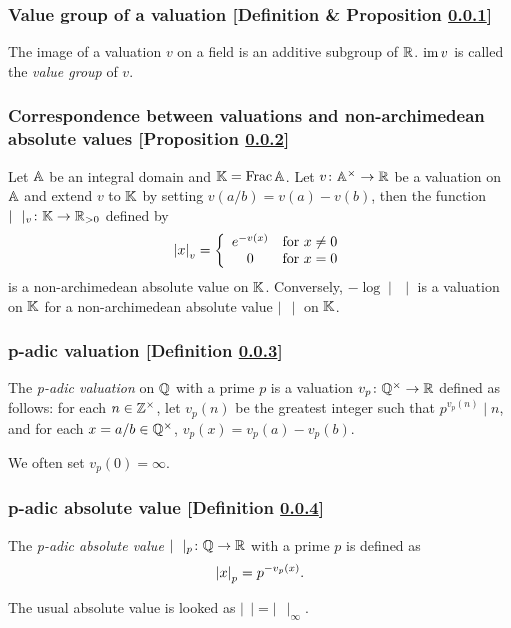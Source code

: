 \subsubsection{Value group of a valuation [Definition \& Proposition \ref{value-group-of-a-valuation}]}\label{value-group-of-a-valuation}
The image of a valuation $v$ on a field is an additive subgroup of $\mathbb{R}$. $\mathrm{im}\, v$ is called the \textit{value group} of $v$.

\subsubsection{Correspondence between valuations and non-archimedean absolute values [Proposition \ref{correspondence-between-valuations-and-non-archimedean-absolute-values}]}\label{correspondence-between-valuations-and-non-archimedean-absolute-values}
Let $\mathbb{A}$ be an integral domain and $\mathbb{K} = \mathrm{Frac} \,\mathbb{A}$. Let $v\colon \mathbb{A}^\times \to \mathbb{R}$ be a valuation on $\mathbb{A}$ and extend $v$ to $\mathbb{K}$ by setting $v(a/b) = v(a) - v(b)$, then the function $\mid\ \ \mid_v \colon \mathbb{K} \to \mathbb{R}_{>0}$ defined by
\[
\left| x \right|_v = \left\{ \begin{array}{cl}
 e^{-v(x)} & \text{for}\ x \neq 0 \\
 0 & \text{for}\ x = 0    
 \end{array} \right.
 \] is a non-archimedean absolute value on $\mathbb{K}$. Conversely, $-\log \mid \,\ \mid$ is a valuation on $\mathbb{K}$ for a non-archimedean absolute value $\mid\ \ \mid$ on $\mathbb{K}$.


\subsubsection{p-adic valuation [Definition \ref{p-adic-valuation}]}\label{p-adic-valuation}
The \textit{p-adic valuation} on $\mathbb{Q}$ with a prime $p$ is a valuation $v_p \colon \mathbb{Q}^\times \to \mathbb{R}$ defined as follows: for each $n \in \mathbb{Z}^\times$, let $v_p(n)$ be the greatest integer such that $p^{v_p(n)} \mid n$, and for each $x = a / b \in \mathbb{Q}^\times$, $v_p(x) = v_p(a) - v_p(b)$.

We often set $v_p(0) = \infty$.

\subsubsection{p-adic absolute value [Definition \ref{p-adic-absolute-value}]}\label{p-adic-absolute-value}
The \textit{p-adic absolute value} $\mid\ \ \mid_p \colon \bb{Q} \to \bb{R}$ with a prime $p$ is defined as
\[
\left| x \right|_p = p^{-v_p(x)}.
\]

The usual absolute value is looked as $\mid\ \ \mid = \mid\ \ \mid_\infty$.